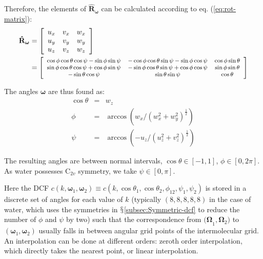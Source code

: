 Therefore, the elements of $\mathbf{\hat{R}}_{\boldsymbol{\omega}}$
can be calculated according to eq. (\ref{eq:rot-matrix}):
\begin{align}
\mathbf{\hat{R}}_{\boldsymbol{\omega}} & =\left[\begin{array}{ccc}
u_{x} & v_{x} & w_{x}\\
u_{y} & v_{y} & w_{y}\\
u_{z} & v_{z} & w_{z}
\end{array}\right]\\
 & =\footnotesize\left[\begin{array}{ccc}
\cos\phi\cos\theta\cos\psi-\sin\phi\sin\psi & -\cos\phi\cos\theta\sin\psi-\sin\phi\cos\psi & \cos\phi\sin\theta\\
\sin\phi\cos\theta\cos\psi+\cos\phi\sin\psi & -\sin\phi\cos\theta\sin\psi+\cos\phi\cos\psi & \sin\phi\sin\theta\\
-\sin\theta\cos\psi & \sin\theta\sin\psi & \cos\theta
\end{array}\right]\nonumber 
\end{align}

The angles $\boldsymbol{\omega}$ are thus found as:
\begin{eqnarray}
\cos\theta & = & w_{z}\nonumber \\
\phi & = & \arccos(w_{x}/(w_{x}^{2}+w_{y}^{2})^{\frac{1}{2}})\label{eq:omega}\\
\psi & = & \arccos(-u_{z}/(u_{z}^{2}+v_{z}^{2})^{\frac{1}{2}})\nonumber 
\end{eqnarray}

The resulting angles are between normal intervals, $\cos\theta\in\left[-1,1\right]$,
$\phi\in\left[0,2\pi\right]$. As water possesses $\mathrm{C}_{2v}$
symmetry, we take $\psi\in\left[0,\pi\right]$. 

Here the DCF $c(k,\boldsymbol{\omega}_{1},\boldsymbol{\omega}_{2})\equiv c(k,\cos\theta_{1},\cos\theta_{2},\phi_{12},\psi_{1},\psi_{2})$
is stored in a discrete set of angles for each value of $k$ (typically
$(8,8,8,8,8)$ in the case of water, which uses the symmetries in
$\mathsection$\ref{subsec:Symmetric-dcf} to reduce the number of
$\phi$ and $\psi$ by two) such that the correspondence from $\mathbf{(\Omega}_{1},\mathbf{\Omega}_{2})$
to $(\boldsymbol{\omega}_{1},\boldsymbol{\omega}_{2})$ usually falls
in between angular grid points of the intermolecular grid. An interpolation
can be done at different orders: zeroth order interpolation, which
directly takes the nearest point, or linear interpolation.

